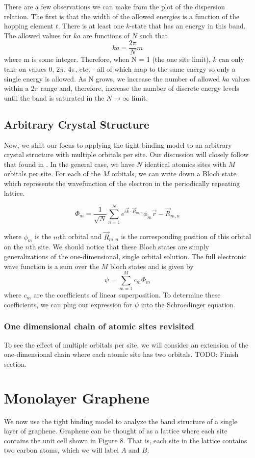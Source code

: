 \documentclass{article}
\begin{document}
There are a few observations we can make from the plot of the dispersion relation. The first is that the width of the allowed energies is a function of the hopping element $t$. There is at least one $k$-state that has an energy in this band. The allowed
values for $ka$ are functions of $N$ such that
$$ ka = \frac{2\pi}{N}m $$
where m is some integer. Therefore, when N = 1 (the one site limit), $k$ can only take on values $0$, $2\pi$, $4\pi$, etc. - all of which map to the same energy so only a single energy is allowed. As N grows, we increase the number of allowed $ka$ values
within a $2\pi$ range and, therefore, increase the number of discrete energy levels until the band is saturated in the $N \rightarrow \infty$ limit.


\subsection{Arbitrary Crystal Structure}
Now, we shift our focus to applying the tight binding model to an arbitrary crystal structure with multiple orbitals per site. Our discussion will closely follow that found in \cite{mccann}. In the general case, we have
$N$ identical atomics sites with $M$ orbitals per site. For each of the $M$ orbitals, we can write down a Bloch state which represents the wavefunction of the electron in the periodically repeating lattice.

$$ \Phi_m = \frac{1}{\sqrt{N}}\sum_{n = 1}^{N}e^{i\vec{k}\cdot\vec{R}_{m,n}}\phi_{m}{\vec{r} - \vec{R}_{m,n}} $$

where $\phi_{m}$ is the $m$th orbital and $\vec{R}_{m,n}$ is the corresponding position of this orbital on the $n$th site. We should notice that these Bloch states are simply generalizations of the one-dimensional, single
orbital solution. The full electronic wave function is a sum over the $M$ bloch states and is given by
$$ \psi = \sum_{m = 1}^{M}c_{m}\Phi_m$$
where $c_m$ are the coefficients of linear superposition. To determine these coefficients, we can plug our expression for $\psi$ into the Schroedinger equation.
\subsubsection{One dimensional chain of atomic sites revisited}
To see the effect of multiple orbitals per site, we will consider an extension of the one-dimensional chain where each atomic site has two orbitals. TODO: Finish section.


\section{Monolayer Graphene}
We now use the tight binding model to analyze the band structure of a single layer of graphene. Graphene can be thought of as a lattice where each site contains the unit cell shown in Figure 8. That is, each site in
the lattice contains two carbon atoms, which we will label $A$ and $B$.
\end{document}

